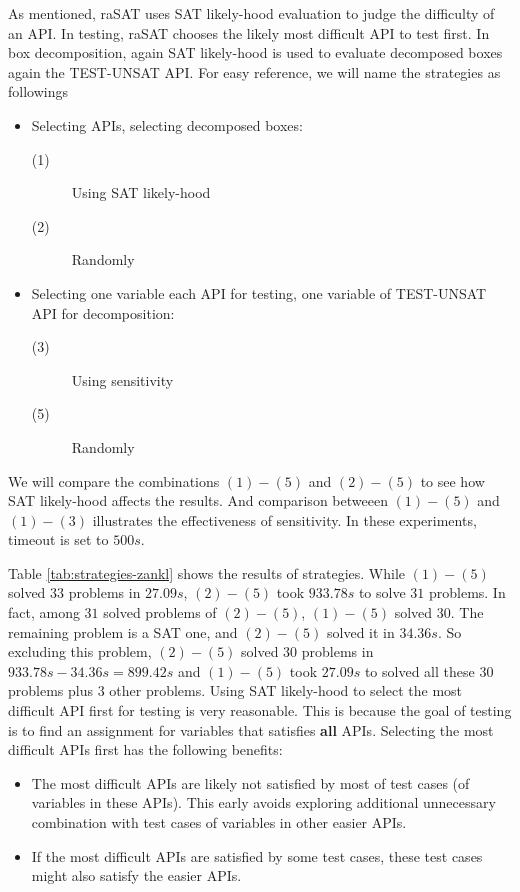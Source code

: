 \documentclass[runningheads,a4paper,oribibl]{llncs}
\begin{document}
As mentioned, raSAT uses SAT likely-hood evaluation to judge the difficulty of an API. In testing, raSAT chooses the likely most difficult API to test first. In box decomposition, again SAT likely-hood is used to evaluate decomposed boxes again the TEST-UNSAT API. For easy reference, we will name the strategies as followings

\begin{itemize}
  \item Selecting APIs, selecting decomposed boxes:
    \begin{description}
      \item[(1)] Using SAT likely-hood %
      \item[(2)] Randomly %
    \end{description}
  \item Selecting one variable each API for testing, one variable of TEST-UNSAT API for decomposition:
    \begin{description}
       \item[(3)] Using sensitivity %
       \item[(5)] Randomly %
    \end{description}
\end{itemize}

We will compare the combinations $(1)-(5)$ and $(2)-(5)$ to see how SAT likely-hood affects the results. And comparison betweeen $(1)-(5)$ and $(1)-(3)$ illustrates the effectiveness of sensitivity. In these experiments, timeout is set to $500s$.

 Table \ref{tab:strategies-zankl} shows the results of strategies. While $(1)-(5)$ solved $33$ problems in $27.09s$, $(2)-(5)$ took $933.78s$ to solve $31$ problems. In fact, among $31$ solved problems of $(2)-(5)$, $(1)-(5)$ solved $30$. The remaining problem is a SAT one, and $(2)-(5)$ solved it in $34.36s$. So excluding this problem, $(2)-(5)$ solved $30$ problems in $933.78s - 34.36s = 899.42s$ and $(1)-(5)$ took $27.09s$ to solved all these $30$ problems plus $3$ other problems. Using SAT likely-hood to select the most difficult API first for testing is very reasonable. This is because the goal of testing is to find an assignment for variables that satisfies \textbf{all} APIs. Selecting the most difficult APIs first has the following benefits: 
\begin{itemize}
  \item The most difficult APIs are likely not satisfied by most of test cases (of variables in these APIs). This early avoids exploring additional unnecessary combination with test cases of variables in other easier APIs.
  \item If the most difficult APIs are satisfied by some test cases, these test cases might also satisfy the easier APIs.
\end{itemize}
\end{document}
